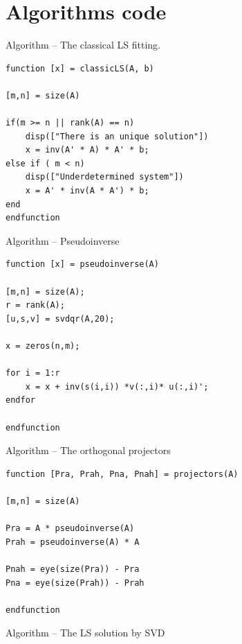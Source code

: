 \documentclass[eng,openany]{mgr}
\begin{document}
\chapter{Algorithms code}
Algorithm  -- The classical LS fitting.\\
\begin{lstlisting}
function [x] = classicLS(A, b)

[m,n] = size(A)

if(m >= n || rank(A) == n)
	disp(["There is an unique solution"])
	x = inv(A' * A) * A' * b;
else if ( m < n)
	disp(["Underdetermined system"])
	x = A' * inv(A * A') * b;
end
endfunction
\end{lstlisting}

Algorithm  -- Pseudoinverse\\
\begin{lstlisting}
function [x] = pseudoinverse(A)

[m,n] = size(A);
r = rank(A);
[u,s,v] = svdqr(A,20);

x = zeros(n,m);

for i = 1:r
	x = x + inv(s(i,i)) *v(:,i)* u(:,i)';
endfor

endfunction
\end{lstlisting}
\newpage
Algorithm  -- The orthogonal projectors\\
\begin{lstlisting}
function [Pra, Prah, Pna, Pnah] = projectors(A)

[m,n] = size(A)

Pra = A * pseudoinverse(A)
Prah = pseudoinverse(A) * A

Pnah = eye(size(Pra)) - Pra
Pna = eye(size(Prah)) - Prah

endfunction
\end{lstlisting}

Algorithm  -- The LS solution by SVD\\
\end{document}
